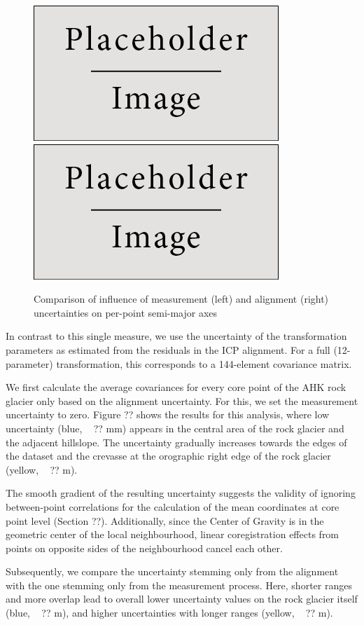 \documentclass[preprint,12pt,3p]{elsarticle}
\begin{document}
\begin{figure}
    \centering
    \includegraphics[width=0.45\linewidth]{placeholder.jpg}
    \includegraphics[width=0.45\linewidth]{placeholder.jpg}
    \caption{Comparison of influence of measurement (left) and alignment (right) uncertainties on per-point semi-major axes}
    \label{fig:plot_c}
\end{figure}

In contrast to this single measure, we use the uncertainty of the transformation parameters as estimated from the residuals in the ICP alignment. For a full (12-parameter) transformation, this corresponds to a 144-element covariance matrix. 

We first calculate the average covariances for every core point of the AHK rock glacier only based on the alignment uncertainty. For this, we set the measurement uncertainty to zero. Figure ?? shows the results for this analysis, where low uncertainty (blue, ~ ?? mm) appears in the central area of the rock glacier and the adjacent hillslope. The uncertainty gradually increases towards the edges of the dataset and the crevasse at the orographic right edge of the rock glacier (yellow, ~ ?? m).

The smooth gradient of the resulting uncertainty suggests the validity of ignoring between-point correlations for the calculation of the mean coordinates at core point level (Section ??). Additionally, since the Center of Gravity is in the geometric center of the local neighbourhood, linear coregistration effects from points on opposite sides of the neighbourhood cancel each other.

Subsequently, we compare the uncertainty stemming only from the alignment with the one stemming only from the measurement process. Here, shorter ranges and more overlap lead to overall lower uncertainty values on the rock glacier itself (blue, ~ ?? m), and higher uncertainties with longer ranges (yellow, ~ ?? m).
\end{document}
